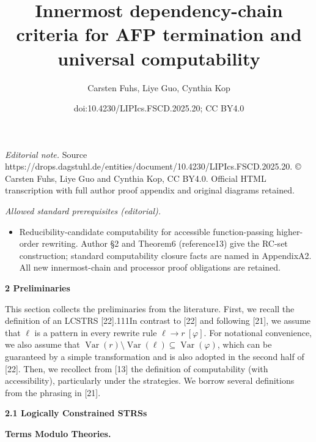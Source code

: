 \documentclass[10pt,a4paper]{amsart}
\title{Innermost dependency-chain criteria for AFP termination and universal computability}
\author{Carsten Fuhs, Liye Guo, Cynthia Kop}
\date{doi:10.4230/LIPIcs.FSCD.2025.20; CC BY4.0}
\begin{document}
\maketitle
\noindent\textit{Editorial note.} Source https://drops.dagstuhl.de/entities/document/10.4230/LIPIcs.FSCD.2025.20. © Carsten Fuhs, Liye Guo and Cynthia Kop, CC BY4.0. Official HTML transcription with full author proof appendix and original diagrams retained.\par\medskip
\noindent\textit{Allowed standard prerequisites (editorial).}\begin{itemize}
\item Reducibility-candidate computability for accessible function-passing higher-order rewriting. Author §2 and Theorem6 (reference13) give the RC-set construction; standard computability closure facts are named in AppendixA2. All new innermost-chain and processor proof obligations are retained.
\end{itemize}\medskip
 
\par\medskip\noindent\textbf{2 Preliminaries}\par
 
 
This section collects the preliminaries from the literature. First, we recall the definition of an LCSTRS [22].111In contrast to [22] and following [21], we assume that $\ell$ is a pattern in every rewrite rule ${\ell}\rightarrow{r}\ [\varphi]$. For notational convenience, we also assume that $\operatorname{Var}(r)\setminus\operatorname{Var}(\ell)\subseteq\operatorname{Var}(\varphi)$, which can be guaranteed by a simple transformation and is also adopted in the second half of [22]. Then, we recollect from [13] the definition of computability (with accessibility), particularly under the strategies. We borrow several definitions from the phrasing in [21].\par
 
 
 
\par\medskip\noindent\textbf{2.1 Logically Constrained STRSs}\par
 
 
\par\medskip\noindent\textbf{Terms Modulo Theories.}\par
 
 
\end{document}
